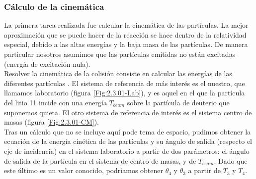 \documentclass[12pt,a4paper]{article}
\numberwithin{equation}{section}
\numberwithin{figure}{section}
\begin{document}
\subsubsection{Cálculo de la cinemática}

La primera tarea realizada fue calcular la cinemática de las partículas. La mejor aproximación que se puede hacer de la reacción se hace dentro de la relatividad especial, debido a las altas energías y la baja masa de las partículas. De manera particular nosotros asumimos que las partículas emitidas no están excitadas (energía de excitación nula). \\

Resolver la cinemática de la colisión consiste en calcular las energías de las diferentes partículas . El sistema de referencia de más interés es el nuestro, que llamamos laboratorio (figura \ref{Fig:2.3.01-Lab}), y es aquel en el que la partícula del litio 11 incide con una energía $T_{beam}$ sobre la partícula de deuterio que suponemos quieta. El otro sistema de referencia de interés es el sistema centro de masas (figura \ref{Fig:2.3.01-CM}). \\

Tras un cálculo que no se incluye aquí pode tema de espacio, pudimos obtener la ecuación de la energía cinética de las partículas y su ángulo de salida (respecto el eje de incidencia) en el sistema laboratorio a partir de dos parámetros: el ángulo de salida de la partícula en el sistema de centro de masas, y de $T_{beam}$. Dado que este último es un valor conocido, podríamos obtener $\theta_4$ y $\theta_3$ a partir de $T_3$ y $T_4$.   \\
\end{document}
